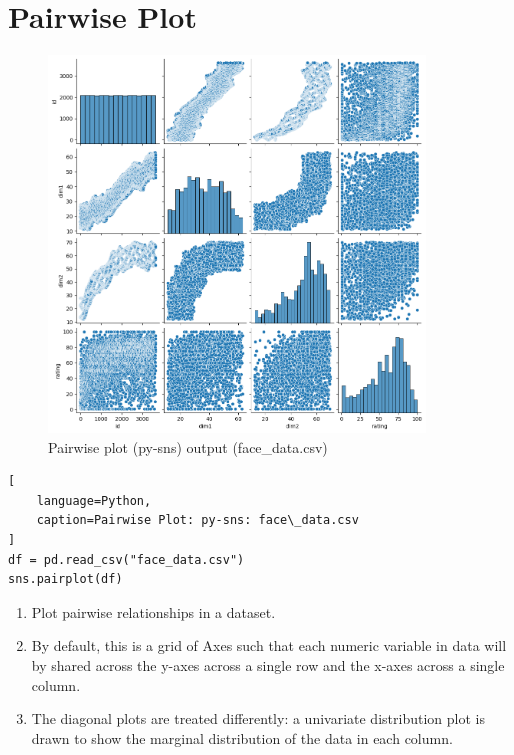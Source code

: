 \section{Pairwise Plot \cite{statistics/book/Statistics-for-Data-Scientists/Maurits-Kaptein, data/online/seaborn.pairplot}} \label{Visualizing Data/Pairwise Plot}


\begin{table}[H]
\begin{minipage}[t]{0.35\linewidth}
\begin{figure}[H]
    \centering
    \includegraphics[width=0.9\linewidth, height=10cm, keepaspectratio]{images/data/__visualizations__/sns-pairplot-face-data.png}
    \caption{Pairwise plot (py-sns) output (face\_data.csv)}
\end{figure}
\end{minipage}
\hspace{0.2cm}
\vrule width 1pt
\hspace{0.5cm}
\begin{minipage}[t]{0.57\linewidth}
\begin{lstlisting}[
    language=Python,
    caption=Pairwise Plot: py-sns: face\_data.csv
]
df = pd.read_csv("face_data.csv")
sns.pairplot(df)
\end{lstlisting}

\vspace{0.3cm}

\begin{enumerate}
    \item Plot pairwise relationships in a dataset. \hfill \cite{data/online/seaborn.pairplot}

    \item By default, this is a grid of Axes such that each numeric variable in data will by shared across the y-axes across a single row and the x-axes across a single column. \hfill \cite{data/online/seaborn.pairplot}

    \item The diagonal plots are treated differently: a univariate distribution plot is drawn to show the marginal distribution of the data in each column. \hfill \cite{data/online/seaborn.pairplot}
\end{enumerate}
\end{minipage}
\end{table}










